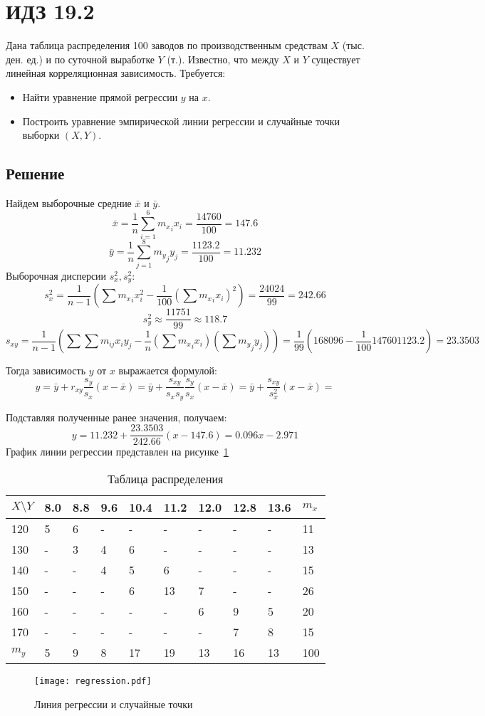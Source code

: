 \documentclass{article}
\theoremstyle{problemstyle}
\begin{document}
\section{ИДЗ 19.2}
Дана таблица распределения 100 заводов по производственным средствам
$X$ (тыс. ден. ед.) и по суточной выработке $Y$ (т.). 
Известно, что между $X$ и $Y$ существует линейная корреляционная зависимость. 
Требуется:
\begin{itemize}
  \item Найти уравнение прямой регрессии $y$ на $x$.
  \item Построить уравнение эмпирической линии регрессии и случайные точки выборки
    $(X, Y)$.
\end{itemize}

\subsection{Решение}
Найдем выборочные средние $\bar x$ и $\bar y$.
\[
  \bar x =
  \frac{1}{n} \sum_{i=1}^6 {m_x}_i x_i =
  \frac{14760}{100} =
  147.6
\]
\[
  \bar y = 
  \frac{1}{n} \sum_{j=1}^8 {m_y}_j y_j =
  \frac{1123.2}{100} = 11.232
\]
Выборочная дисперсии $s_x^2, s_y^2$:
\[
  s_x^2 = 
  \frac{1}{n-1} \left(\sum {m_x}_i x_i^2 - \frac{1}{100} \left(\sum {m_x}_i{x_i}\right)^2\right) =
  \frac{24024}{99} =
  242.66
\]
\[
  s_y^2 \approx \frac{11751}{99} \approx 118.7
\]
\[
  s_{xy} =
  \frac{1}{n-1} \left( \sum \sum m_{ij} x_i y_j - \frac{1}{n} \left(\sum {m_x}_i x_i \right)\left(\sum {m_y}_j y_j \right) \right) =
  \frac{1}{99} ( 168096 - \frac{1}{100} 14760 1123.2) =
  23.3503
\]

Тогда зависимость $y$ от $x$ выражается формулой:
\[
  y = 
  \bar y + r_{xy} \frac{s_y}{s_x} (x - \bar x) =
  \bar y + \frac{s_{xy}}{s_x s_y} \frac{s_y}{s_x} (x - \bar x) = 
  \bar y + \frac{s_{xy}}{s_x^2} (x - \bar x) =
\]

Подставляя полученные ранее значения, получаем:
\[
  y = 11.232 + \frac{23.3503}{242.66} (x - 147.6) =
      0.096 x - 2.971
\]
График линии регрессии представлен на рисунке~\ref{fig:regression}

\begin{table}[ht!]
  \centering
  \begin{tabular}{|l|l|l|l|l|l|l|l|l|l|}
    \hline
    $X \setminus Y$ & 8.0 & 8.8 & 9.6 & 10.4 & 11.2 & 12.0 & 12.8 & 13.6 & $m_x$ \\ 
    \hline
    120             & 5 & 6 & - & - & - & - & - & - & 11 \\ 
    130 & - & 3 & 4 & 6 & - & - & - & - & 13 \\ 
    140 & - & - & 4 & 5 & 6 & - & - & - & 15 \\
    150 & - & - & - & 6 & 13 & 7 & - & - & 26 \\
    160 & - & - & - & - & - & 6 & 9 & 5 & 20 \\ 
    170 & - & - & - & - & - & - & 7 & 8 & 15 \\
    \hline
    $m_y$ & 5 & 9 & 8 & 17 & 19 & 13 & 16 & 13 & 100 \\
    \hline
    
  \end{tabular}
  \caption{Таблица распределения}\label{tab:2_data}
\end{table}

\begin{figure}
  \texttt{[image: regression.pdf]}
  \caption{Линия регрессии и случайные точки}\label{fig:regression}
\end{figure}
\end{document}
